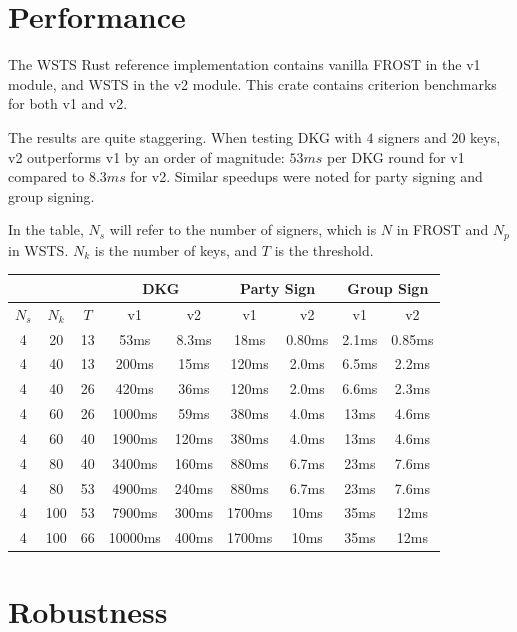 \documentclass{article}
\theoremstyle{plain}
\theoremstyle{definition}
\theoremstyle{remark}
\begin{document}
\newpage
\onecolumn
\section{
  Performance
}

The WSTS Rust reference implementation \cite{wstsimpl} contains vanilla FROST in the v1 module, and WSTS in the v2 module.  This crate contains criterion benchmarks for both v1 and v2.

The results are quite staggering.  When testing DKG with $4$ signers and $20$ keys, v2 outperforms v1 by an order of magnitude: $53 ms$ per DKG round for v1 compared to $8.3 ms$ for v2.  Similar speedups were noted for party signing and group signing.

In the table, $N_s$ will refer to the number of signers, which is $N$ in FROST and $N_p$ in WSTS.  $N_k$ is the number of keys, and $T$ is the threshold.

\begin{center}
  \begin{tabular}{ c|c|c|c|c|c|c|c|c } 
    \multicolumn{3}{c|}{} & \multicolumn{2}{|c|}{DKG}& \multicolumn{2}{|c|}{Party Sign} & \multicolumn{2}{|c}{Group Sign} \\
    \hline
    \hline
    $N_s$ & $N_k$ & $T$ & v1 & v2 & v1 & v2 & v1 & v2 \\ 
    \hline
    \hline
    4 & 20 & 13 & 53ms & 8.3ms & 18ms & 0.80ms & 2.1ms & 0.85ms \\ 
    4 & 40 & 13 & 200ms & 15ms & 120ms & 2.0ms & 6.5ms & 2.2ms \\ 
    4 & 40 & 26 & 420ms & 36ms & 120ms & 2.0ms & 6.6ms & 2.3ms \\ 
    4 & 60 & 26 & 1000ms & 59ms & 380ms & 4.0ms & 13ms & 4.6ms \\ 
    4 & 60 & 40 & 1900ms & 120ms & 380ms & 4.0ms & 13ms & 4.6ms \\ 
    4 & 80 & 40 & 3400ms & 160ms & 880ms & 6.7ms & 23ms & 7.6ms \\ 
    4 & 80 & 53 & 4900ms & 240ms & 880ms & 6.7ms & 23ms & 7.6ms \\ 
    4 & 100 & 53 & 7900ms & 300ms & 1700ms & 10ms & 35ms & 12ms \\ 
    4 & 100 & 66 & 10000ms & 400ms & 1700ms & 10ms & 35ms & 12ms \\ 
  \end{tabular}
\end{center}


\section{
  Robustness
}
\end{document}
